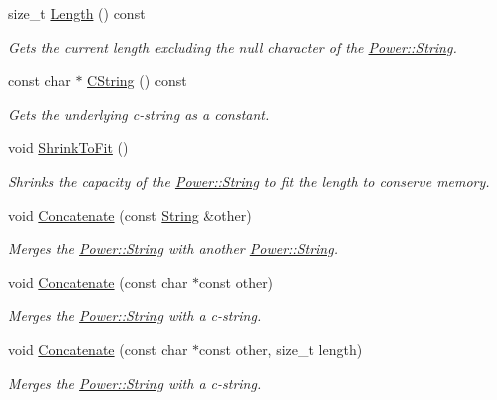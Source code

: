\begin{DoxyCompactItemize}
size\+\_\+t \hyperlink{class_power_1_1_string_a04a9b77cf53b0421d4da863ec1d62707}{Length} () const
\begin{DoxyCompactList}\small\item\em Gets the current length excluding the null character of the \hyperlink{class_power_1_1_string}{Power\+::\+String}. \end{DoxyCompactList}\item 
const char $\ast$ \hyperlink{class_power_1_1_string_a8a0120f3e5dee6cb50be979f8b1175e4}{C\+String} () const
\begin{DoxyCompactList}\small\item\em Gets the underlying c-\/string as a constant. \end{DoxyCompactList}\item 
void \hyperlink{class_power_1_1_string_a5a787c065417773262c90e8da4e8e079}{Shrink\+To\+Fit} ()
\begin{DoxyCompactList}\small\item\em Shrinks the capacity of the \hyperlink{class_power_1_1_string}{Power\+::\+String} to fit the length to conserve memory. \end{DoxyCompactList}\item 
void \hyperlink{class_power_1_1_string_a06e6def1040275302b2ea78e6ceb05e6}{Concatenate} (const \hyperlink{class_power_1_1_string}{String} \&other)
\begin{DoxyCompactList}\small\item\em Merges the \hyperlink{class_power_1_1_string}{Power\+::\+String} with another \hyperlink{class_power_1_1_string}{Power\+::\+String}. \end{DoxyCompactList}\item 
void \hyperlink{class_power_1_1_string_aa8d8f7ef094a1057e5ab46742b42ad13}{Concatenate} (const char $\ast$const other)
\begin{DoxyCompactList}\small\item\em Merges the \hyperlink{class_power_1_1_string}{Power\+::\+String} with a c-\/string. \end{DoxyCompactList}\item 
void \hyperlink{class_power_1_1_string_aa21774f7245c99303be83b452735fe00}{Concatenate} (const char $\ast$const other, size\+\_\+t length)
\begin{DoxyCompactList}\small\item\em Merges the \hyperlink{class_power_1_1_string}{Power\+::\+String} with a c-\/string. \end{DoxyCompactList}\item 

\end{DoxyCompactItemize}
